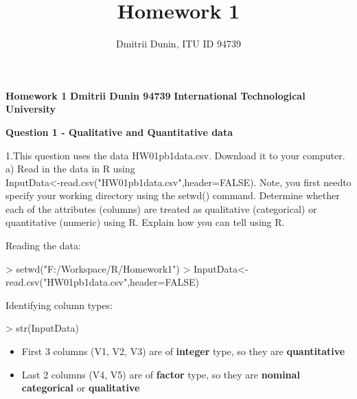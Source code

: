 \documentclass[12pt]{article}
\title{Homework 1}
\author{Dmitrii Dunin, ITU ID 94739}
\begin{document}

\begin{center}
{\bf\Large Homework 1}
\linebreak
\linebreak
{\bf\Large Dmitrii Dunin 94739}
\linebreak
\linebreak
{\bf\Large International Technological University}
\end{center}
\begin{center}
{\bf\Large Question 1 - Qualitative and Quantitative data}
\linebreak
\end{center}
1.This question uses the data HW01pb1data.csv. 
Download it to your computer.
\tabularnewline
a) Read in the data in R using\\
\tabularnewline
InputData<-read.csv("HW01pb1data.csv",header=FALSE). 
Note, you first needto specify your working directory using 
the setwd() command. Determine whether each of the attributes (columns) 
are treated as qualitative (categorical) or quantitative
(numeric) using R. Explain how you can tell using R.


Reading the data:
\begin{Schunk}
\begin{Sinput}
> setwd("F:/Workspace/R/Homework1")
> InputData<-read.csv("HW01pb1data.csv",header=FALSE)
\end{Sinput}
\end{Schunk}

Identifying column types:
\begin{Schunk}
\begin{Sinput}
> str(InputData)
\end{Sinput}
\end{Schunk}
\begin{itemize}
\item{First 3 columns (V1, V2, V3) are of \textbf{integer} type, so they are \textbf{quantitative}}
\item{Last 2 columns (V4, V5) are of \textbf{factor} type, so they are \textbf{nominal categorical} or \textbf{qualitative}}
\end{itemize}
\end{document}
